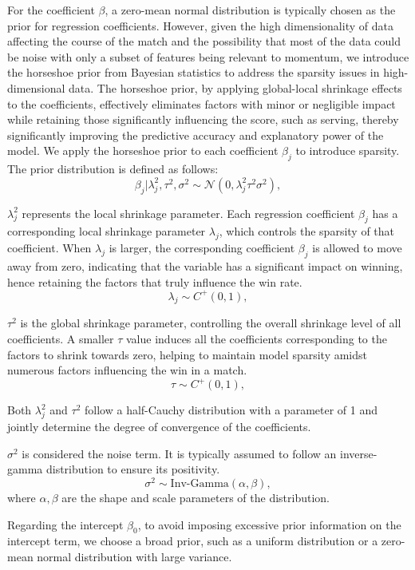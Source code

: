 \documentclass{mcmthesis}
\begin{document}
For the coefficient $\beta$, a zero-mean normal distribution is typically chosen as the prior for regression coefficients. However, given the high dimensionality of data affecting the course of the match and the possibility that most of the data could be noise with only a subset of features being relevant to momentum, we introduce the horseshoe prior from Bayesian statistics to address the sparsity issues in high-dimensional data. The horseshoe prior, by applying global-local shrinkage effects to the coefficients, effectively eliminates factors with minor or negligible impact while retaining those significantly influencing the score, such as serving, thereby significantly improving the predictive accuracy and explanatory power of the model. We apply the horseshoe prior to each coefficient $\beta_j$ to introduce sparsity. The prior distribution is defined as follows:
$$
\beta_j | \lambda^2_j, \tau^2, \sigma^2 \sim \mathcal{N}(0, \lambda_j^2 \tau^2 \sigma^2),
$$

$\lambda_j^2$ represents the local shrinkage parameter. Each regression coefficient $\beta_j$ has a corresponding local shrinkage parameter $\lambda_j$, which controls the sparsity of that coefficient. When $\lambda_j$ is larger, the corresponding coefficient $\beta_j$ is allowed to move away from zero, indicating that the variable has a significant impact on winning, hence retaining the factors that truly influence the win rate.
$$
\lambda_j \sim C^+(0, 1),
$$

$\tau^2$ is the global shrinkage parameter, controlling the overall shrinkage level of all coefficients. A smaller $\tau$ value induces all the coefficients corresponding to the factors to shrink towards zero, helping to maintain model sparsity amidst numerous factors influencing the win in a match.
$$
\tau \sim C^+(0, 1),
$$

Both $\lambda_j^2$ and $\tau^2$ follow a half-Cauchy distribution with a parameter of 1 and jointly determine the degree of convergence of the coefficients.

$\sigma^2$ is considered the noise term. It is typically assumed to follow an inverse-gamma distribution to ensure its positivity.
$$
\sigma^2 \sim \text{Inv-Gamma}(\alpha, \beta),
$$
where $\alpha, \beta$ are the shape and scale parameters of the distribution.

Regarding the intercept $\beta_0$, to avoid imposing excessive prior information on the intercept term, we choose a broad prior, such as a uniform distribution or a zero-mean normal distribution with large variance.
\end{document}
